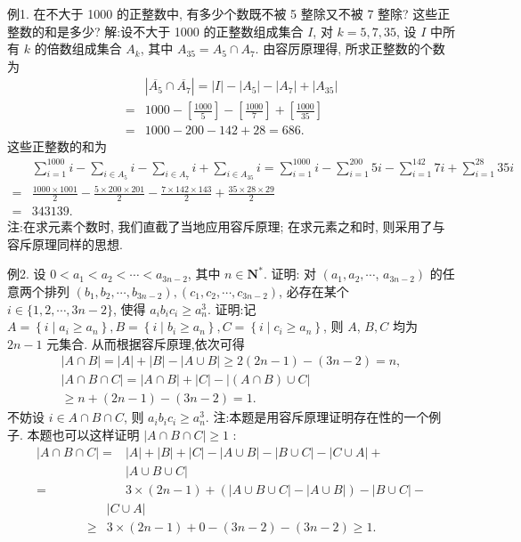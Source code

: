 例1. 在不大于 1000 的正整数中, 有多少个数既不被 5 整除又不被 7 整除? 这些正整数的和是多少?
解:设不大于 1000 的正整数组成集合 $I$, 对 $k=5,7,35$, 设 $I$ 中所有 $k$ 的倍数组成集合 $A_k$, 其中 $A_{35}=A_5 \cap A_7$.
由容厉原理得, 所求正整数的个数为
$$
\begin{aligned}
& \left|\overline{A_5} \cap \overline{A_7}\right|=|I|-\left|A_5\right|-\left|A_7\right|+\left|A_{35}\right| \\
= & 1000-\left[\frac{1000}{5}\right]-\left[\frac{1000}{7}\right]+\left[\frac{1000}{35}\right] \\
= & 1000-200-142+28=686 .
\end{aligned}
$$
这些正整数的和为
$$
\begin{aligned}
& \sum_{i=1}^{1000} i-\sum_{i \in A_5} i-\sum_{i \in A_7} i+\sum_{i \in A_{35}} i=\sum_{i=1}^{1000} i-\sum_{i=1}^{200} 5 i-\sum_{i=1}^{142} 7 i+\sum_{i=1}^{28} 35 i \\
= & \frac{1000 \times 1001}{2}-\frac{5 \times 200 \times 201}{2}-\frac{7 \times 142 \times 143}{2}+\frac{35 \times 28 \times 29}{2} \\
= & 343139 .
\end{aligned}
$$
注:在求元素个数时, 我们直截了当地应用容斥原理; 在求元素之和时, 则采用了与容斥原理同样的思想.



例2. 设 $0<a_1<a_2<\cdots<a_{3 n-2}$, 其中 $n \in \mathbf{N}^*$. 证明: 对 $\left(a_1, a_2, \cdots\right.$, $\left.a_{3 n-2}\right)$ 的任意两个排列 $\left(b_1, b_2, \cdots, b_{3 n-2}\right),\left(c_1, c_2, \cdots, c_{3 n-2}\right)$, 必存在某个 $i \in\{1,2, \cdots, 3 n-2\}$, 使得 $a_i b_i c_i \geqslant a_n^3$.
证明:记 $A=\left\{i \mid a_i \geqslant a_n\right\}, B=\left\{i \mid b_i \geqslant a_n\right\}, C=\left\{i \mid c_i \geqslant a_n\right\}$, 则 $A$, $B, C$ 均为 $2 n-1$ 元集合.
从而根据容斥原理,依次可得
$$
\begin{gathered}
|A \cap B|=|A|+|B|-|A \cup B| \geqslant 2(2 n-1)-(3 n-2)=n, \\
|A \cap B \cap C|=|A \cap B|+|C|-|(A \cap B) \cup C| \\
\geqslant n+(2 n-1)-(3 n-2)=1 .
\end{gathered}
$$
不妨设 $i \in A \cap B \cap C$, 则 $a_i b_i c_i \geqslant a_n^3$.
注:本题是用容斥原理证明存在性的一个例子.
本题也可以这样证明 $|A \cap B \cap C| \geqslant 1$ :
$$
\begin{aligned}
|A \cap B \cap C|= & |A|+|B|+|C|-|A \cup B|-|B \cup C|-|C \cup A|+ \\
& |A \cup B \cup C| \\
= & 3 \times(2 n-1)+(|A \cup B \cup C|-|A \cup B|)-|B \cup C|-
\end{aligned}
$$
$$
\begin{aligned}
& |C \cup A| \\
\geqslant & 3 \times(2 n-1)+0-(3 n-2)-(3 n-2) \geqslant 1 .
\end{aligned}
$$



